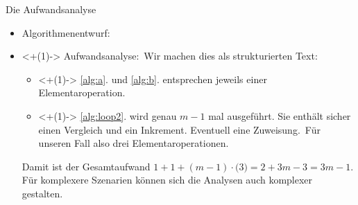 \begin{frame}{Die Aufwandsanalyse}
\begin{itemize}[]
    \item Algorithmenentwurf: \\
    \usebox\algobox\vfill
    \item<+(1)-> Aufwandsanalyse:\pause\ Wir machen dies als strukturierten Text: \begin{itemize}
        \item<+(1)-> \ref{alg:a}. und \ref{alg:b}. entsprechen jeweils einer Elementaroperation.
        \item<+(1)-> \ref{alg:loop2}. wird genau \(m - 1\) mal ausgeführt. Sie enthält sicher einen Vergleich und ein Inkrement. Eventuell eine Zuweisung.\pause\ Für unseren Fall also drei Elementaroperationen.
    \end{itemize}
        \pause Damit ist der Gesamtaufwand \(1 + 1 + (m - 1) \cdot \bigl( 3 \bigr) = 2 + 3m - 3 = 3m - 1\).\medskip\\
        \pause Für komplexere Szenarien können sich die Analysen auch komplexer gestalten.
\end{itemize}
\end{frame}
\fi

